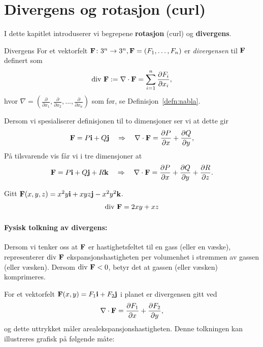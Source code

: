 %
%
%
\section{Divergens og rotasjon (curl)}\label{div_curl}

I dette kapitlet introduserer vi begrepene \textbf{rotasjon} (curl) og \textbf{divergens}. 

\begin{defn}{Divergens}
For et vektorfelt $\mathbf{F}\colon 3^n\rightarrow 3^n , \mathbf{F}=(F_1,\ldots, F_n)$ er \emph{divergensen} til $\mathbf{F}$ definert som 
\[\text{div }\mathbf{F} := \nabla\cdot \mathbf{F}=\sum_{i=1}^n \frac{\partial F_i}{\partial x_i},\]
hvor $\nabla=(\frac{\partial}{\partial x_1},\frac{\partial}{\partial x_2},..., \frac{\partial}{\partial x_n})$ som før, se Definisjon~\ref{defn:nabla}.
\end{defn}
Dersom vi spesialiserer definisjonen til to dimensjoner ser vi at dette gir 
\begin{align*}
\mathbf{F} = P\mathbf{i} + Q\mathbf{j}\quad\Rightarrow\quad\nabla\cdot\mathbf{F} = \frac{\partial P}{\partial x} + \frac{\partial Q}{\partial y},
\end{align*}
På tilsvarende vis får vi i tre dimensjoner at
\begin{align*}
\mathbf{F} = P\mathbf{i} + Q\mathbf{j} + R\mathbf{k}\quad\Rightarrow\quad\nabla\cdot\mathbf{F} = \frac{\partial P}{\partial x} + \frac{\partial Q}{\partial y} + \frac{\partial R}{\partial z} .
\end{align*}


\begin{eks}{}
Gitt $\mathbf{F}(x,y,z) = x^2y \mathbf{i} + xyz \mathbf{j} - x^2y^2 \mathbf{k}$.
\[
\text{div } \mathbf{F} = 2xy + xz
\]
\end{eks}{}
\paragraph{Fysisk tolkning av divergens:} Dersom vi tenker oss at $\mathbf{F}$ er hastighetsfeltet til en gass (eller en væske), representerer $\text{div }\mathbf{F}$ ekspansjonshastigheten per volumenhet i strømmen av gassen (eller væsken). 
Dersom $\text{div } \mathbf{F} < 0$, betyr det at gassen (eller væsken) komprimeres.

For et vektorfelt $\mathbf{F}(x, y) = F_1 \mathbf{i} + F_2 \mathbf{j}$ i planet er divergensen gitt ved
\[
\nabla \cdot \mathbf{F} = \frac{\partial F_1}{\partial x} + \frac{\partial F_2}{\partial y},
\]
og dette uttrykket måler arealekspansjonshastigheten.
Denne tolkningen kan illustreres grafisk på følgende måte:

